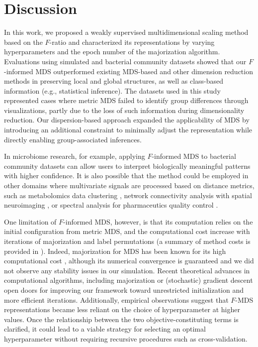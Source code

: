\documentclass[10pt,letterpaper]{article}
\newcommand{\1}{{\rm 1}\kern-0.24em{\rm I}}
\begin{document}
\section*{Discussion}
In this work, we proposed a weakly supervised multidimensional scaling method based on the $F$-ratio and characterized its representations by varying hyperparameters and the epoch number of the majorization algorithm. Evaluations using simulated and bacterial community datasets showed that our $F$-informed MDS outperformed existing MDS-based and other dimension reduction methods in preserving local and global structures, as well as class-based information (e.g., statistical inference). The datasets used in this study represented cases where metric MDS failed to identify group differences through visualizations, partly due to the loss of such information during dimensionality reduction. Our dispersion-based approach expanded the applicability of MDS by introducing an additional constraint to minimally adjust the representation while directly enabling group-associated inferences.

In microbiome research, for example, applying $F$-informed MDS to bacterial community datasets can allow users to interpret biologically meaningful patterns with higher confidence. It is also possible that the method could be employed in other domains where multivariate signals are processed based on distance metrics, such as metabolomics data clustering \cite{Hansel25}, network connectivity analysis with spatial neuroimaging \cite{Kinsey24}, or spectral analysis for pharmaceutics quality control \cite{Puchert11}.

One limitation of $F$-informed MDS, however, is that its computation relies on the initial configuration from metric MDS, and the computational cost increase with iterations of majorization and label permutations (a summary of method costs is provided in ). Indeed, majorization for MDS has been known for its high computational cost \cite{Fang25}, although its numerical convergence is guaranteed \cite{deleeuw24} and we did not observe any stability issues in our simulation. Recent theoretical advances in computational algorithms, including majorization \cite{Streeter23} or (stochastic) gradient descent \cite{Demaine21, zheng19} open doors for improving our framework toward unrestricted initialization and more efficient iterations. Additionally, empirical observations suggest that $F$-MDS representations became less reliant on the choice of hyperparameter at higher values. Once the relationship between the two objective-constituting terms is clarified, it could lead to a viable strategy for selecting an optimal hyperparameter without requiring recursive procedures such as cross-validation.
\end{document}
